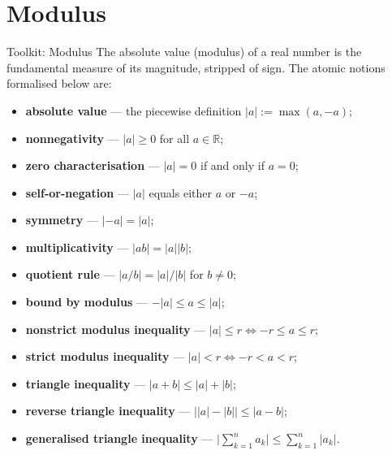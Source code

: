 \section{Modulus}

\begin{toolkitbox}{Toolkit: Modulus}
The absolute value (modulus) of a real number is the fundamental measure
of its magnitude, stripped of sign.  The atomic notions formalised below
are:
\begin{itemize}
  \item \textbf{absolute value} --- the piecewise definition
        $\lvert a \rvert := \max(a, -a)$;
  \item \textbf{nonnegativity} --- $\lvert a \rvert \ge 0$ for all
        $a \in \mathbb{R}$;
  \item \textbf{zero characterisation} --- $\lvert a \rvert = 0$ if and
        only if $a = 0$;
  \item \textbf{self-or-negation} --- $\lvert a \rvert$ equals either $a$
        or $-a$;
  \item \textbf{symmetry} --- $\lvert -a \rvert = \lvert a \rvert$;
  \item \textbf{multiplicativity} --- $\lvert ab \rvert =
        \lvert a \rvert \lvert b \rvert$;
  \item \textbf{quotient rule} --- $\lvert a/b \rvert =
        \lvert a \rvert / \lvert b \rvert$ for $b \ne 0$;
  \item \textbf{bound by modulus} ---
        $-\lvert a \rvert \le a \le \lvert a \rvert$;
  \item \textbf{nonstrict modulus inequality} ---
        $\lvert a \rvert \le r \iff -r \le a \le r$;
  \item \textbf{strict modulus inequality} ---
        $\lvert a \rvert < r \iff -r < a < r$;
  \item \textbf{triangle inequality} ---
        $\lvert a + b \rvert \le \lvert a \rvert + \lvert b \rvert$;
  \item \textbf{reverse triangle inequality} ---
        $\lvert \lvert a \rvert - \lvert b \rvert \rvert
        \le \lvert a - b \rvert$;
  \item \textbf{generalised triangle inequality} ---
        $\lvert \sum_{k=1}^{n} a_k \rvert
        \le \sum_{k=1}^{n} \lvert a_k \rvert$.
\end{itemize}
\end{toolkitbox}


